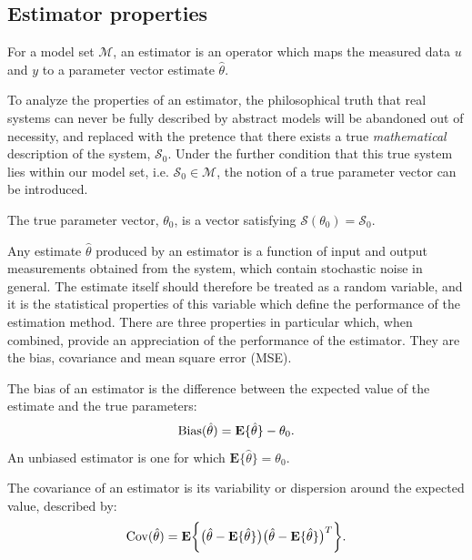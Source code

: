 \subsection{Estimator properties}

\begin{defn}[Estimator]
For a model set $\mathcal{M}$, an estimator is an operator which maps the measured data $u$ and $y$ to a parameter vector estimate $\hat{\theta}$. 
\end{defn}
To analyze the properties of an estimator, the philosophical truth that real systems can never be fully described by abstract models will be abandoned out of necessity, and replaced with the pretence that there exists a true \emph{mathematical} description of the system, $\mathcal{S}_0$. Under the further condition that this true system lies within our model set, i.e. $\mathcal{S}_0 \in \mathcal{M}$, the notion of a true parameter vector can be introduced.
\begin{defn}
The true parameter vector, $\theta_0$, is a vector satisfying $\mathcal{S}(\theta_0) = \mathcal{S}_0$.
\end{defn}

Any estimate $\hat{\theta}$ produced by an estimator is a function of input and output measurements obtained from the system, which contain stochastic noise in general. The estimate itself should therefore be treated as a random variable, and it is the statistical properties of this variable which define the performance of the estimation method. There are three properties in particular which, when combined, provide an appreciation of the performance of the estimator. They are the bias, covariance and mean square error (MSE).

\begin{defn}[Bias]
The bias of an estimator is the difference between the expected value of the estimate and the true parameters:
\begin{equation}
\operatorname{Bias}(\hat{\theta}) = \textbf{E}\{ \hat{\theta} \} - \theta_0.
\end{equation}
An unbiased estimator is one for which $\textbf{E}\{ \hat{\theta} \} = \theta_0$.
\end{defn}

\begin{defn}[Covariance]
The covariance of an estimator is its variability or dispersion around the expected value, described by:
\begin{equation}
\operatorname{Cov}(\hat{\theta}) =  \textbf{E} \bigg\{ \big( \hat{\theta} - \textbf{E}\{ \hat{\theta} \} \big) \big( \hat{\theta} - \textbf{E}\{ \hat{\theta} \} \big)^T \bigg\}.
\end{equation}
\end{defn}

